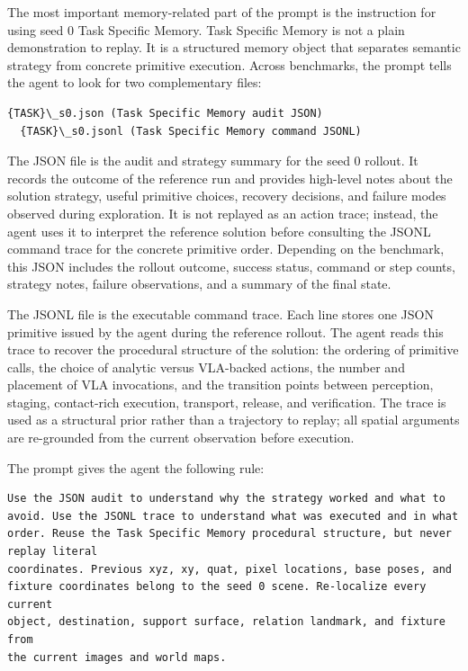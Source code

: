 \documentclass[11pt]{article}
\begin{document}
The most important memory-related part of the prompt is the instruction for using
seed 0 Task Specific Memory. Task Specific Memory is not a plain demonstration to replay. It is a structured
memory object that separates semantic strategy from concrete primitive execution.
Across benchmarks, the prompt tells the agent to look for two complementary files:
\begin{lstlisting}[frame=single,framerule=0.5pt]
  {TASK}\_s0.json (Task Specific Memory audit JSON)
  {TASK}\_s0.jsonl (Task Specific Memory command JSONL)
  \end{lstlisting}

The JSON file is the audit and strategy summary for the seed 0 rollout. It records the outcome of the reference run and provides high-level notes about the solution strategy, useful primitive choices, recovery decisions, and failure modes observed during exploration. It is not replayed as an action trace; instead, the agent uses it to interpret the reference solution before consulting the JSONL command trace for the concrete primitive order. Depending on the benchmark, this JSON includes the rollout outcome,  success status, command or step counts, strategy notes, failure observations, and a summary of the final state.

The JSONL file is the executable command trace. Each line stores one JSON primitive
  issued by the agent during the reference rollout. The agent reads this trace to recover
  the procedural structure of the solution: the ordering of primitive calls, the choice
  of analytic versus VLA-backed actions, the number and placement of VLA invocations,
  and the transition points between perception, staging, contact-rich execution,
  transport, release, and verification. The trace is used as a structural prior rather
  than a trajectory to replay; all spatial arguments are re-grounded from the current
  observation before execution.

The prompt gives the agent the following rule:

\begin{samepage}
\begin{lstlisting}[frame=single,framerule=0.5pt]
Use the JSON audit to understand why the strategy worked and what to
avoid. Use the JSONL trace to understand what was executed and in what
order. Reuse the Task Specific Memory procedural structure, but never replay literal
coordinates. Previous xyz, xy, quat, pixel locations, base poses, and
fixture coordinates belong to the seed 0 scene. Re-localize every current
object, destination, support surface, relation landmark, and fixture from
the current images and world maps.
\end{lstlisting}
\end{samepage}
\end{document}
